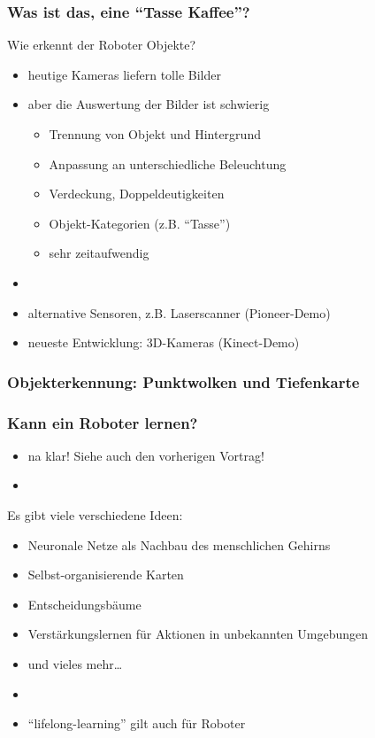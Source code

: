 \documentclass[t]{beamer}
\def\ii{\item[]}
\begin{document}
\begin{frame}
\frametitle{Was ist das, eine "`Tasse Kaffee"'?}
Wie erkennt der Roboter Objekte?
\begin{itemize}
\item heutige Kameras liefern tolle Bilder
\item aber die Auswertung der Bilder ist schwierig
\begin{itemize}
 \item Trennung von Objekt und Hintergrund
 \item Anpassung an unterschiedliche Beleuchtung
 \item Verdeckung, Doppeldeutigkeiten
 \item Objekt-Kategorien (z.B. "`Tasse"')
 \item sehr zeitaufwendig 
\end{itemize}
\ii
\item alternative Sensoren, z.B. Laserscanner  \hfill (Pioneer-Demo) 
\item neueste Entwicklung: 3D-Kameras \hfill (Kinect-Demo)
\end{itemize}
\end{frame}


\begin{frame}
\frametitle{Objekterkennung: Punktwolken und Tiefenkarte}
\end{frame}


\begin{frame}
\frametitle{Kann ein Roboter lernen?}
\begin{itemize}
\item na klar!  Siehe auch den vorherigen Vortrag!
\ii
\end{itemize}
Es gibt viele verschiedene Ideen:
\begin{itemize}
\item Neuronale Netze als Nachbau des menschlichen Gehirns 
\item Selbst-organisierende Karten
\item Entscheidungsbäume
\item Verstärkungslernen für Aktionen in unbekannten Umgebungen
\item und vieles mehr\dots
\ii
\item "`lifelong-learning"' gilt auch für Roboter
\end{itemize}
\end{frame}
\end{document}
